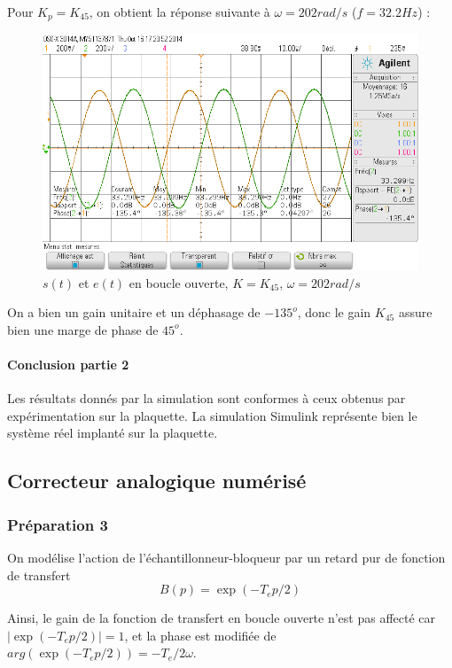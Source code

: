 \documentclass[../../Cours_M1.tex]{subfiles}
\begin{document}
\clearpage

Pour $K_p=K_{45}$, on obtient la réponse suivante à $\omega = 202rad/s$ ($f=32.2Hz$) :

\begin{figure}[h!]
\centering
\includegraphics[scale=0.5]{m2K45w0dB.png}
\caption{$s(t)$ et $e(t)$ en boucle ouverte, $K=K_{45}$, $\omega = 202rad/s$}
\end{figure}

On a bien un gain unitaire et un déphasage de $-135^o$, donc le gain $K_{45}$ assure bien une marge de phase de $45^o$.

\bigskip

\paragraph{Conclusion partie 2} Les résultats donnés par la simulation sont conformes à ceux obtenus par expérimentation sur la plaquette. La simulation Simulink représente bien le système réel implanté sur la plaquette.

\clearpage

\subsection*{Correcteur analogique numérisé}
\subsubsection*{Préparation 3}
On modélise l'action de l'échantillonneur-bloqueur par un retard pur de fonction de transfert \[B(p) = \exp(-T_ep/2)\]

Ainsi, le gain de la fonction de transfert en boucle ouverte n'est pas affecté car $|\exp(-T_ep/2)| = 1$, et la phase est modifiée de $arg(\exp(-T_ep/2)) = -T_e/2 \omega$.
\end{document}
